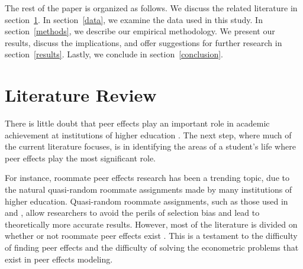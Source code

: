 \documentclass[12pt,letterpaper,english,fleqn]{article}
\begin{document}
The rest of the paper is organized as follows. 
We discuss the related literature in section~\ref{litreview}. 
In section~\ref{data}, we examine the data used in this study. 
In section~\ref{methods}, we describe our empirical methodology.
We present our results, discuss the implications, and offer suggestions for further research in section~\ref{results}.
Lastly, we conclude in section~\ref{conclusion}.

\section{Literature Review}\label{litreview}

There is little doubt that peer effects play an important role in academic achievement at institutions of higher education \citep{smith2015new,luppino2015college,ost2010role}. 
The next step, where much of the current literature focuses, is in identifying the areas of a student's life where peer effects play the most significant role. 

For instance, roommate peer effects research has been a trending topic, due to the natural quasi-random roommate assignments made by many institutions of higher education.
Quasi-random roommate assignments, such as those used in \citet{griffith2014peer} and \citet{zimmerman2003peer}, allow researchers to avoid the perils of selection bias and lead to theoretically more accurate results.
However, most of the literature is divided on whether or not roommate peer effects exist \citep{griffith2014peer,zimmerman2003peer,sacerdote2000peer,foster2006s,mcewan2006roommate}.
This is a testament to the difficulty of finding peer effects and the difficulty of solving the econometric problems that exist in peer effects modeling.
\end{document}

